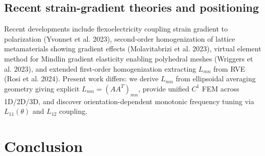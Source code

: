 \documentclass[final,3p,times,fleqn]{elsarticle}
\newcommand{\rev}[1]{\textcolor{revcolor}{#1}}
\begin{document}
\subsection{Recent strain-gradient theories and positioning}
\rev{Recent developments include flexoelectricity coupling strain gradient to polarization (Yvonnet et al. 2023), second-order homogenization of lattice metamaterials showing gradient effects (Molavitabrizi et al. 2023), virtual element method for Mindlin gradient elasticity enabling polyhedral meshes (Wriggers et al. 2023), and extended first-order homogenization extracting $L_{mn}$ from RVE (Rosi et al. 2024). Present work differs: we derive $L_{mn}$ from ellipsoidal averaging geometry giving explicit $L_{mn}=(AA^T)_{mn}$, provide unified $C^1$ FEM across 1D/2D/3D, and discover orientation-dependent monotonic frequency tuning via $L_{11}(\theta)$ and $L_{12}$ coupling.}

\section{\large{Conclusion}}

\label{sec:conclusion}
\end{document}
